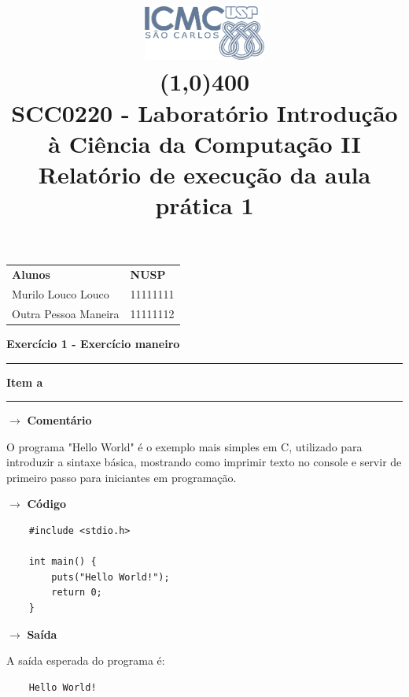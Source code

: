 \documentclass[12pt, a4paper]{article}
\date{}
\author{}
\title{
    \includegraphics[width=4cm]{logo.png} \\
    \vspace{-0.5cm} \line(1,0){400} \vspace{0.5cm} \\
    \Large \textbf{SCC0220 - Laboratório Introdução à Ciência da Computação II} \\
    \vspace{1em}
    \large \textbf{Relatório de execução da aula prática 1} \\
    \vspace{-3.5em}
}
\def\grosso{\vspace{-1.3em}\begin{center}\rule{200mm}{4pt}\end{center}}
\def\fino{\vspace{-1.5em}\begin{center}\rule{200mm}{0.5pt}\end{center}}
\begin{document}
\maketitle

\begin{tabular}{ll}
    \textbf{Alunos}      & \textbf{NUSP} \\
    Murilo Louco Louco   & 11111111 \\
    Outra Pessoa Maneira & 11111112 \\
\end{tabular}
\vspace{1.5em}
\sffamily

\large \textbf{Exercício 1 - Exercício maneiro}
\grosso

\large  \textbf{Item a}
\fino

\large $\rightarrow$ \textbf{Comentário} \small

O programa "Hello World" é o exemplo mais simples em C, utilizado para introduzir a sintaxe básica, mostrando como imprimir texto no console e servir de primeiro passo para iniciantes em programação.

\large $\rightarrow$ \textbf{Código} \small

\begin{verbatim}
    #include <stdio.h>

    int main() {
        puts("Hello World!");
        return 0;
    }
\end{verbatim}

\large $\rightarrow$ \textbf{Saída} \small

A saída esperada do programa é:

\begin{verbatim}
    Hello World!
\end{verbatim}
\end{document}

